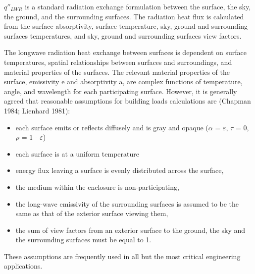 \({q''_{LWR}}\) is a standard radiation exchange formulation between the surface, the sky, the ground, and the surrounding surfaces. The radiation heat flux is calculated from the surface absorptivity, surface temperature, sky, ground and surrounding surfaces temperatures, and sky, ground and surrounding surfaces view factors.

The longwave radiation heat exchange between surfaces is dependent on surface temperatures, spatial relationships between surfaces and surroundings, and material properties of the surfaces. The relevant material properties of the surface, emissivity e and absorptivity a, are complex functions of temperature, angle, and wavelength for each participating surface. However, it is generally agreed that reasonable assumptions for building loads calculations are (Chapman 1984; Lienhard 1981):

\begin{itemize}
\item
  each surface emits or reflects diffusely and is gray and opaque ($\alpha$ = $\varepsilon$, $\tau$ = 0, $\rho$ = 1 - $\varepsilon$)
\item
  each surface is at a uniform temperature
\item
  energy flux leaving a surface is evenly distributed across the surface,
\item
  the medium within the enclosure is non-participating,
\item
  the long-wave emissivity of the surrounding surfaces is assumed to be the same as that of the exterior surface viewing them,
\item
  the sum of view factors from an exterior surface to the ground, the sky and the surrounding surfaces must be equal to 1.
\end{itemize}

These assumptions are frequently used in all but the most critical engineering applications.

